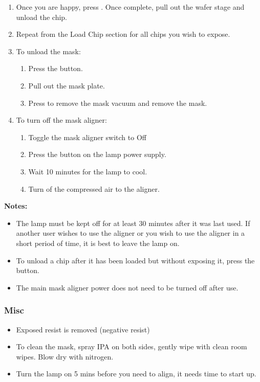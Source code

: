 \begin{enumerate}
\item Once you are happy, press . Once complete, pull out the wafer stage and unload the chip.
\item Repeat from the Load Chip section for all chips you wish to expose.
\item To unload the mask:
\begin{enumerate} 
  \item Press the  button.
  \item Pull out the mask plate.
  \item Press  to remove the mask vacuum and remove the mask.
\end{enumerate}
\item To turn off the mask aligner:
\begin{enumerate} 
  \item Toggle the mask aligner switch to Off
  \item Press the  button on the lamp power supply.
  \item Wait 10 minutes for the lamp to cool.
  \item Turn of the compressed air to the aligner.
\end{enumerate}
\end{enumerate}
\textbf{Notes:}
\begin{itemize} [noitemsep, nolistsep]
  \item The lamp must be kept off for at least 30 minutes after it was last used. If another user wishes to use the aligner
        or you wish to use the aligner in a short period of time, it is best to leave the lamp on.
  \item To unload a chip after it has been loaded but without exposing it, press the  button.
  \item The main mask aligner power does not need to be turned off after use.
\end{itemize}
\newpage
\subsubsection{Misc}
\begin{itemize}
\item Exposed resist is removed (negative resist)
\item To clean the mask, spray IPA on both sides, gently wipe with clean room wipes. Blow dry with nitrogen.
\item Turn the lamp on 5 mins before you need to align, it needs time to start up.
\end{itemize}
\newpage


